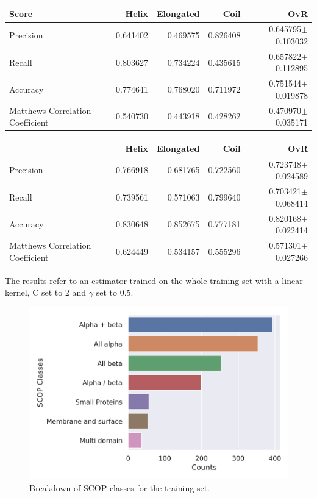 \documentclass[nocrop]{bioinfo}
\begin{document}
\begin{supplementary}
\begin{table}[h]
{\begin{tabular}{lrrrr}
	\toprule
Score
	{} &              Helix &              Elongated &              Coil &            OvR  \\
	\midrule
	Precision                        & \num{0.641402} & \num{0.469575} & \num{0.826408} & \num{0.645795}$\pm$\num{0.103032} \\
	Recall                           & \num{0.803627} & \num{0.734224} & \num{0.435615} & \num{0.657822}$\pm$\num{0.112895} \\
	Accuracy                         & \num{0.774641} & \num{0.768020} & \num{0.711972} & \num{0.751544}$\pm$\num{0.019878} \\
	Matthews Correlation Coefficient & \num{0.540730} & \num{0.443918} & \num{0.428262} & \num{0.470970}$\pm$\num{0.035171} \\
	\bottomrule
\end{tabular}
}
{}	


 {	
\begin{tabular}{lrrrr}
	\toprule
	{} &              Helix &              Elongated &              Coil &            OvR\\
	\midrule
	Precision                        & \num{0.766918} & \num{0.681765} & \num{0.722560} & \num{0.723748}$\pm$\num{0.024589} \\
	Recall                           & \num{0.739561} & \num{0.571063} & \num{0.799640} & \num{0.703421}$\pm$\num{0.068414} \\
	Accuracy                         & \num{0.830648} & \num{0.852675} & \num{0.777181} & \num{0.820168}$\pm$\num{0.022414} \\
	Matthews Correlation Coefficient & \num{0.624449} & \num{0.534157} & \num{0.555296} & \num{0.571301}$\pm$\num{0.027266} \\
	\bottomrule
\end{tabular}
}
{The results refer to an estimator trained on the whole training set with a linear\\ kernel, C set to 2 and $\gamma$ set to 0.5.}
\end{table}

\begin{figure}[!b]
	\includegraphics[width=\textwidth]{scop.png}
	\caption{Breakdown of SCOP classes for the training set.}\label{fig:scop}
\end{figure}
\end{supplementary}
\end{document}
